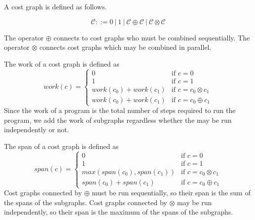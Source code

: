 A cost graph is defined as follows.

\[ \mathcal{C} ::= 0\ |\  1\ |\  \mathcal{C} \oplus \mathcal{C}\ |\  \mathcal{C} \otimes \mathcal{C} \]

The operator $\oplus$ connects to cost graphs who must be combined
sequentially.  The operator $\otimes$ connects cost graphs which may be
combined in parallel.

The work of a cost graph is defined as
%
\begin{equation*}
  work(c) = \begin{cases}
    0 &\text{if } c = 0 \\
    1 &\text{if } c = 1 \\
    work(c_0) + work(c_1) &\text{if } c = c_0 \otimes c_1 \\
    work(c_0) + work(c_1) &\text{if } c = c_0 \oplus c_1
  \end{cases}
\end{equation*}
%
Since the work of a program is the total number of steps required to run the
program, we add the work of subgraphs regardless whether the may be run
independently or not.


The span of a cost graph is defined as
%
\begin{equation*}
  span(c) = \begin{cases}
    0 &\text{if } c = 0 \\
    1 &\text{if } c = 1 \\
    max(span(c_0), span(c_1)) &\text{if } c = c_0 \otimes c_1 \\
    span(c_0) + span(c_1) &\text{if } c = c_0 \oplus c_1
  \end{cases}
\end{equation*}
%
Cost graphs connected by $\oplus$ must be run sequentially, so their span is the
sum of the spans of the subgraphs. Cost graphs connected by $\otimes$ may be
run independently, so their span is the maximum of the spans of the subgraphs.


